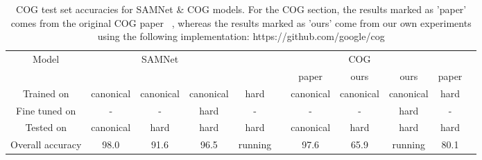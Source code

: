 \begin{table}[t]
	\tiny
	
	\caption{COG test set accuracies for  SAMNet \& COG models. For the COG section, the results marked as 'paper' comes from the original COG paper ~\cite{yang2018dataset}, whereas the results marked as 'ours' come from our own experiments using the following implementation: https://github.com/google/cog }
	
	\centering
	\begin{tabular}{ccccccccccc}
		\toprule
		Model & & SAMNet & && && COG&& \\
		\cmidrule{2-5} \cmidrule{7-11} 
		&&&&& & paper & ours & ours & paper&\\
		\cmidrule{7-9} \cmidrule{10-11}
		Trained on       & canonical & canonical & canonical & hard &           &  canonical  & canonical  & canonical & hard \\ 
		Fine tuned on  & - & - & hard  & - &           & -   & - & hard & - \\ 
		Tested on        & canonical & hard & hard & hard &            &canonical  & hard & hard & hard  \\ 
		\midrule
		
		Overall accuracy & 98.0 & 91.6 & 96.5  & running &           & 97.6  & 65.9 & running& 80.1 \\ 
		
		\midrule 
		

\end{tabular}
\end{table}

